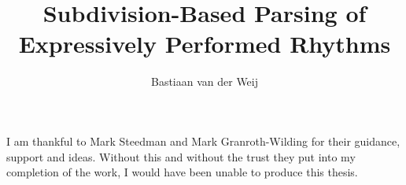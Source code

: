 \documentclass[logo,msc,cogsci]{infthesis/infthesis}
\title{Subdivision-Based Parsing of Expressively Performed Rhythms}
\author{Bastiaan van der Weij}
\begin{document}
\begin{preliminary}
\maketitle
\begin{acknowledgements}

I am thankful to Mark Steedman and Mark Granroth-Wilding for their guidance, support and ideas. Without this and without the trust they put into my completion of the work, I would have been unable to produce this thesis.

\end{acknowledgements}

\standarddeclaration


\tableofcontents


\end{preliminary}



%
%





%
\appendix




\end{document}

